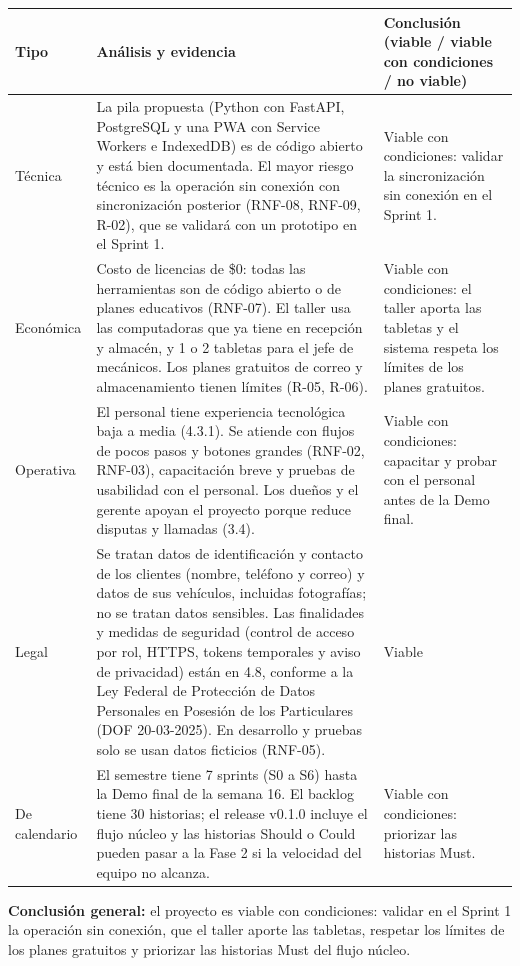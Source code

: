 {\def\LTcaptype{none} %
\begin{longtable}[]{@{}
  >{\raggedright\arraybackslash}p{}
  >{\raggedright\arraybackslash}p{}
  >{\raggedright\arraybackslash}p{}@{}}
\toprule\noalign{}
\begin{minipage}[b]{\linewidth}\raggedright
\textbf{Tipo}
\end{minipage} & \begin{minipage}[b]{\linewidth}\raggedright
\textbf{Análisis y evidencia}
\end{minipage} & \begin{minipage}[b]{\linewidth}\raggedright
\textbf{Conclusión (viable / viable con condiciones / no viable)}
\end{minipage} \\
\midrule\noalign{}
\endhead
\bottomrule\noalign{}
\endlastfoot
Técnica & La pila propuesta (Python con FastAPI, PostgreSQL y una PWA
con Service Workers e IndexedDB) es de código abierto y está bien
documentada. El mayor riesgo técnico es la operación sin conexión con
sincronización posterior (RNF-08, RNF-09, R-02), que se validará con un
prototipo en el Sprint 1. & Viable con condiciones: validar la
sincronización sin conexión en el Sprint 1. \\
Económica & Costo de licencias de \$0: todas las herramientas son de
código abierto o de planes educativos (RNF-07). El taller usa las
computadoras que ya tiene en recepción y almacén, y 1 o 2 tabletas para
el jefe de mecánicos. Los planes gratuitos de correo y almacenamiento
tienen límites (R-05, R-06). & Viable con condiciones: el taller aporta
las tabletas y el sistema respeta los límites de los planes
gratuitos. \\
Operativa & El personal tiene experiencia tecnológica baja a media
(4.3.1). Se atiende con flujos de pocos pasos y botones grandes (RNF-02,
RNF-03), capacitación breve y pruebas de usabilidad con el personal. Los
dueños y el gerente apoyan el proyecto porque reduce disputas y llamadas
(3.4). & Viable con condiciones: capacitar y probar con el personal
antes de la Demo final. \\
Legal & Se tratan datos de identificación y contacto de los clientes
(nombre, teléfono y correo) y datos de sus vehículos, incluidas
fotografías; no se tratan datos sensibles. Las finalidades y medidas de
seguridad (control de acceso por rol, HTTPS, tokens temporales y aviso
de privacidad) están en 4.8, conforme a la Ley Federal de Protección de
Datos Personales en Posesión de los Particulares (DOF 20-03-2025). En
desarrollo y pruebas solo se usan datos ficticios (RNF-05). & Viable \\
De calendario & El semestre tiene 7 sprints (S0 a S6) hasta la Demo
final de la semana 16. El backlog tiene 30 historias; el release v0.1.0
incluye el flujo núcleo y las historias Should o Could pueden pasar a la
Fase 2 si la velocidad del equipo no alcanza. & Viable con condiciones:
priorizar las historias Must. \\
\end{longtable}
}

\textbf{Conclusión general:} el proyecto es viable con condiciones:
validar en el Sprint 1 la operación sin conexión, que el taller aporte
las tabletas, respetar los límites de los planes gratuitos y priorizar
las historias Must del flujo núcleo.
